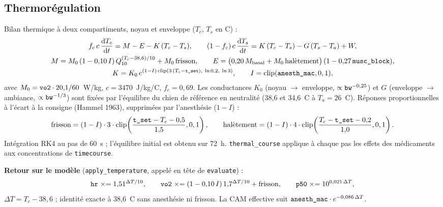 \documentclass[10pt,a4paper]{article}
\newcommand{\cmd}[1]{\texttt{#1}}
\newcommand{\vp}[1]{\text{\texttt{\detokenize{#1}}}}
\newcommand{\dd}{\mathrm{d}}
\begin{document}
\subsection{Thermorégulation}\label{sec:thermo}
Bilan thermique à deux compartiments, noyau et enveloppe ($T_c$, $T_s$ en \degre C) :
\begin{gather}
f_c\,c\,\frac{\dd T_c}{\dd t} = M - E - K\,(T_c - T_s),\qquad
(1 - f_c)\,c\,\frac{\dd T_s}{\dd t} = K\,(T_c - T_s) - G\,(T_s - T_a) + W,\\
M = M_0\,(1 - 0{,}10\,I)\,Q_{10}^{(T_c - 38{,}6)/10} + M_0\,\text{frisson},\qquad
E = \big(0{,}20\,M_\text{basal} + M_0\,\text{halètement}\big)\,(1 - 0{,}27\,\vp{musc_block}),\\
K = K_0\,e^{(1 - I)\,\text{clip}(3\,(T_c - \vp{t_set}),\ \ln 0{,}2,\ \ln 3)},\qquad I = \text{clip}(\vp{anesth_mac}, 0, 1),
\end{gather}
avec $M_0 = \vp{vo2}\cdot 20{,}1/60$~W/kg, $c = 3470$~J/kg/\degre C, $f_c = 0{,}69$. Les conductances
$K_0$ (noyau $\to$ enveloppe, $\propto \vp{bw}^{-0{,}25}$) et $G$ (enveloppe $\to$ ambiance,
$\propto \vp{bw}^{-1/3}$) sont fixées par l'équilibre du chien de référence en neutralité
(38,6 et 34,6~\degre C à $T_a = 26$~\degre C). Réponses proportionnelles à l'écart à la consigne
(Hammel 1963), supprimées par l'anesthésie ($1 - I$) :
\begin{gather}
\text{frisson} = (1 - I)\cdot 3\cdot\text{clip}\!\left(\frac{\vp{t_set} - T_c - 0{,}5}{1{,}5}, 0, 1\right),\qquad
\text{halètement} = (1 - I)\cdot 4\cdot\text{clip}\!\left(\frac{T_c - \vp{t_set} - 0{,}2}{1{,}0}, 0, 1\right).
\end{gather}
Intégration RK4 au pas de 60~s ; l'équilibre initial est obtenu sur 72~h. \cmd{thermal\_course}
applique à chaque pas les effets des médicaments aux concentrations de \cmd{timecourse}.

\textbf{Retour sur le modèle} (\cmd{apply\_temperature}, appelé en tête de \cmd{evaluate}) :
\begin{gather}
\vp{hr} \mathrel{\times}= 1{,}51^{\Delta T/10},\qquad
\vp{vo2} \mathrel{\times}= (1 - 0{,}10\,I)\,1{,}7^{\Delta T/10} + \text{frisson},\qquad
\vp{p50} \mathrel{\times}= 10^{0{,}021\,\Delta T},
\end{gather}
$\Delta T = T_c - 38{,}6$ ; identité exacte à 38,6~\degre C sans anesthésie ni frisson. La CAM
effective suit $\vp{anesth_mac}\cdot e^{-0{,}086\,\Delta T}$.
\end{document}
